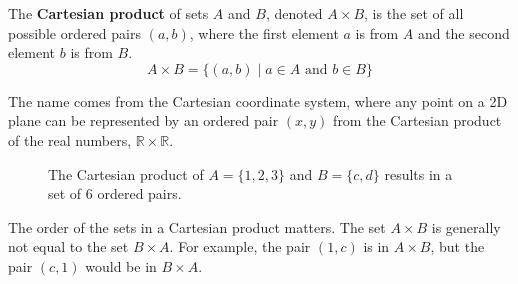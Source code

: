 \begin{definition}
    The \textbf{Cartesian product} of sets $A$ and $B$, denoted $A \times B$, is the set of all possible ordered pairs $(a, b)$, where the first element $a$ is from $A$ and the second element $b$ is from $B$.
    \[ A \times B = \{ (a, b) \mid a \in A \text{ and } b \in B \} \]
\end{definition}

The name comes from the Cartesian coordinate system, where any point on a 2D plane can be represented by an ordered pair $(x, y)$ from the Cartesian product of the real numbers, $\mathbb{R} \times \mathbb{R}$.

\begin{figure}[htbp]
    \centering
    \caption{The Cartesian product of $A=\{1,2,3\}$ and $B=\{c,d\}$ results in a set of 6 ordered pairs.}
    \label{fig:cartesian_product}
\end{figure}

\begin{remark}
    The order of the sets in a Cartesian product matters. The set $A \times B$ is generally not equal to the set $B \times A$. For example, the pair $(1, c)$ is in $A \times B$, but the pair $(c, 1)$ would be in $B \times A$.
\end{remark}


